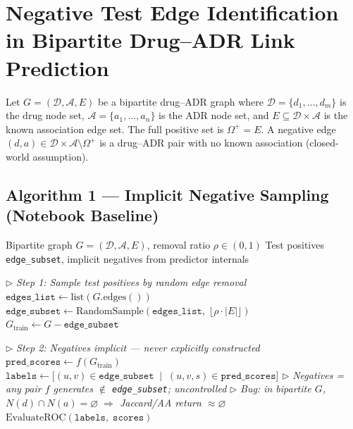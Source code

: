 \documentclass[12pt, a4paper]{article}
\newcommand{\set}[1]{\mathcal{#1}}                  %
\newcommand{\posset}{\Omega^{+}}                    %
\renewcommand{\algorithmiccomment}[1]{\hfill\(\triangleright\) \textit{\small #1}}
\begin{document}
\section*{Negative Test Edge Identification in Bipartite Drug--ADR Link
          Prediction}

\noindent
Let $G = (\set{D}, \set{A}, E)$ be a bipartite drug--ADR graph where
$\set{D} = \{d_1, \ldots, d_m\}$ is the drug node set,
$\set{A} = \{a_1, \ldots, a_n\}$ is the ADR node set, and
$E \subseteq \set{D} \times \set{A}$ is the known association edge set.
The full positive set is $\posset = E$.
A negative edge $(d, a) \in \set{D} \times \set{A} \setminus \posset$ is a
drug--ADR pair with no known association (closed-world assumption).

\subsection*{Algorithm 1 — Implicit Negative Sampling (Notebook Baseline)}

\begin{algorithm}[H]
\caption{Implicit Negative Sampling (Notebook, flawed)}
\label{alg:implicit}
\begin{algorithmic}[1]
    \Require Bipartite graph $G = (\set{D}, \set{A}, E)$,
             removal ratio $\rho \in (0,1)$
    \Ensure  Test positives \texttt{edge\_subset},
             implicit negatives from predictor internals

    \medskip
    \State \algorithmiccomment{Step 1: Sample test positives by random edge removal}
    \State $\texttt{edges\_list} \leftarrow \text{list}(G.\text{edges}())$
    \State $\texttt{edge\_subset} \leftarrow
           \text{RandomSample}\!\left(\texttt{edges\_list},\;
           \lfloor \rho \cdot |E| \rfloor\right)$
    \State $G_{\text{train}} \leftarrow G - \texttt{edge\_subset}$

    \medskip
    \State \algorithmiccomment{Step 2: Negatives implicit — never explicitly constructed}
        \State $\texttt{pred\_scores} \leftarrow f(G_{\text{train}})$
        \State $\texttt{labels} \leftarrow
               \bigl[(u,v) \in \texttt{edge\_subset}
               \;\mid\; (u, v, s) \in \texttt{pred\_scores}\bigr]$
        \State \algorithmiccomment{Negatives = any pair $f$ generates
               $\notin$ \texttt{edge\_subset}; uncontrolled}
        \State \algorithmiccomment{Bug: in bipartite $G$,
               $N(d)\cap N(a)=\varnothing\;\Rightarrow$
               Jaccard/AA return $\approx\varnothing$}
        \State $\text{EvaluateROC}(\texttt{labels},\;\texttt{scores})$
    \EndFor
\end{algorithmic}
\end{algorithm}
\end{document}
